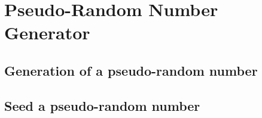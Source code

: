 \chapter{Pseudo-Random Number Generator}

\section{Generation of a pseudo-random number}

\section{Seed a pseudo-random number}